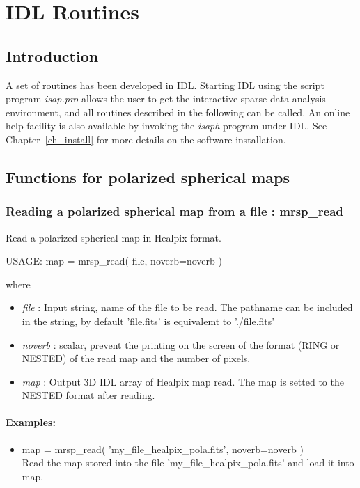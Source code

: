 
\chapter{IDL Routines}
\label{ch_mrsp_idl}


\section{Introduction}
A set of routines has been developed in IDL. Starting IDL using the script program {\em isap.pro} allows the user 
to get the interactive sparse data analysis  environment, and all routines described in the following can be called. 
An online help facility is also available by invoking the {\em isaph} program under IDL. See Chapter~\ref{ch_install} for more
details on the software installation.
  
\section{Functions for polarized spherical maps}

\subsection{Reading a polarized spherical map from a file : mrsp\_read}
Read a polarized spherical map in Healpix format.
{\bf
\begin{center}
     USAGE: map = mrsp\_read( file, noverb=noverb )
\end{center}}
where
\begin{itemize}
\item {\em file} : Input string, name of the file to be read. The pathname can be included in the string, by default 'file.fits' is equivalemt to './file.fits'
\item {\em noverb} : scalar, prevent the printing on the screen of the format (RING or NESTED) of the read map and the number of pixels.
\item {\em map} : Output 3D IDL array of Healpix map read. The map is setted to the NESTED format after reading.
\end{itemize}

\subsubsection*{Examples:} 
\begin{itemize}
\item map = mrsp\_read( 'my\_file\_healpix\_pola.fits', noverb=noverb ) \\
Read the map stored into the file 'my\_file\_healpix\_pola.fits' and load it into map.
\end{itemize}



